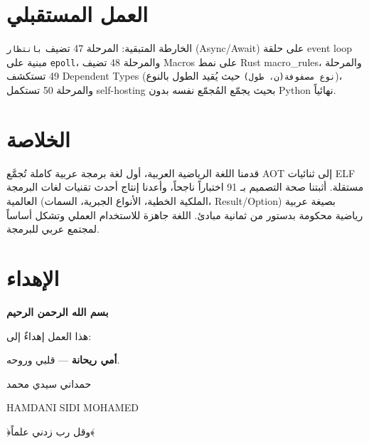 \documentclass[sigconf]{acmart}
\begin{document}
\section{العمل المستقبلي}
\label{sec:future}

الخارطة المتبقية: المرحلة 47 تضيف \texttt{بانتظار} (Async/Await) على حلقة
event loop مبنية على \texttt{epoll}، والمرحلة 48 تضيف Macros على نمط Rust
macro\_rules، والمرحلة 49 تستكشف Dependent Types (\texttt{نوع مصفوفة(ن، طول)}
حيث يُقيد الطول بالنوع)، والمرحلة 50 تستكمل self-hosting بحيث يجمّع المُجمّع
نفسه بدون Python نهائياً.

\section{الخلاصة}
\label{sec:conclusion}

قدمنا اللغة الرياضية العربية، أول لغة برمجة عربية كاملة تُجمَّع AOT إلى
ثنائيات ELF مستقلة. أثبتنا صحة التصميم بـ 91 اختباراً ناجحاً، وأعدنا إنتاج
أحدث تقنيات لغات البرمجة العالمية (الملكية الخطية، الأنواع الجبرية، السمات،
Result/Option) بصيغة عربية رياضية محكومة بدستور من ثمانية مبادئ. اللغة جاهزة
للاستخدام العملي وتشكل أساساً لمجتمع عربي للبرمجة.

\section*{الإهداء}

\begin{center}
\begin{minipage}{0.8\textwidth}
\centering
{\LARGE\bfseries بسم الله الرحمن الرحيم}

\medskip
هذا العمل إهداءٌ إلى:

\textbf{أمي ريحانة} — قلبي وروحه.

\medskip
حمداني سيدي محمد

HAMDANI SIDI MOHAMED

﴿وقل رب زدني علماً﴾
\end{minipage}
\end{center}



\end{document}
